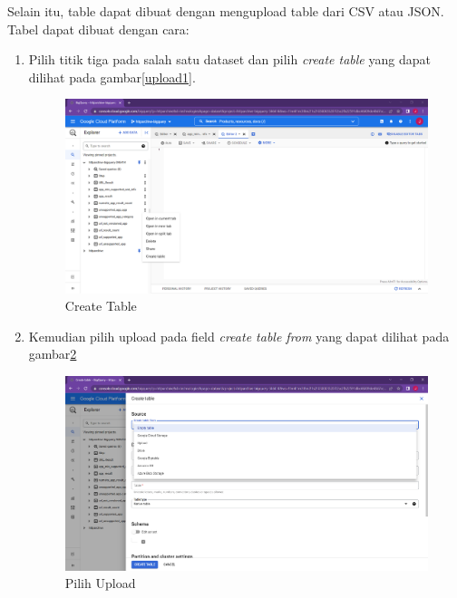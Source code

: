 Selain itu, table dapat dibuat dengan mengupload table dari CSV atau JSON. Tabel dapat dibuat dengan cara:
\begin{enumerate}
	\item Pilih titik tiga pada salah satu dataset dan pilih \textit{create table} yang dapat dilihat pada gambar\ref{upload1}.
	\begin{figure}[H]
		\centering  
		\includegraphics[scale=0.35]{Gambar/upload_step_1.png}  
		\caption{Create Table} 
		\label{fig:upload1}
	\end{figure}

	\item Kemudian pilih upload pada field \textit{create table from} yang dapat dilihat pada gambar\ref{fig:upload2}
	\begin{figure}[H]
		\centering  
		\includegraphics[scale=0.35]{Gambar/upload_step_2.png}  
		\caption{Pilih Upload} 
		\label{fig:upload2}
	\end{figure}


\end{enumerate}
